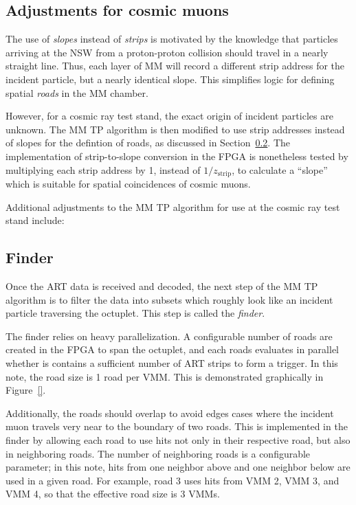 \subsection{Adjustments for cosmic muons}
\label{sec:alg-crts}

The use of \textit{slopes} instead of \textit{strips} is motivated by the knowledge that particles arriving at the NSW from a proton-proton collision should travel in a nearly straight line. Thus, each layer of MM will record a different strip address for the incident particle, but a nearly identical slope. This simplifies logic for defining spatial \textit{roads} in the MM chamber.

However, for a cosmic ray test stand, the exact origin of incident particles are unknown. The MM TP algorithm is then modified to use strip addresses instead of slopes for the defintion of roads, as discussed in Section~\ref{sec:alg-finder}. The implementation of strip-to-slope conversion in the FPGA is nonetheless tested by multiplying each strip address by 1, instead of $1/z_\text{strip}$, to calculate a ``slope'' which is suitable for spatial coincidences of cosmic muons.

Additional adjustments to the MM TP algorithm for use at the cosmic ray test stand include: 

\subsection{Finder}
\label{sec:alg-finder}

Once the ART data is received and decoded, the next step of the MM TP algorithm is to filter the data into subsets which roughly look like an incident particle traversing the octuplet. This step is called the \textit{finder}.

The finder relies on heavy parallelization. A configurable number of roads are created in the FPGA to span the octuplet, and each roads evaluates in parallel whether is contains a sufficient number of ART strips to form a trigger. In this note, the road size is 1 road per VMM. This is demonstrated graphically in Figure~\ref{}.

Additionally, the roads should overlap to avoid edges cases where the incident muon travels very near to the boundary of two roads. This is implemented in the finder by allowing each road to use hits not only in their respective road, but also in neighboring roads. The number of neighboring roads is a configurable parameter; in this note, hits from one neighbor above and one neighbor below are used in a given road. For example, road 3 uses hits from VMM 2, VMM 3, and VMM 4, so that the effective road size is 3 VMMs.

